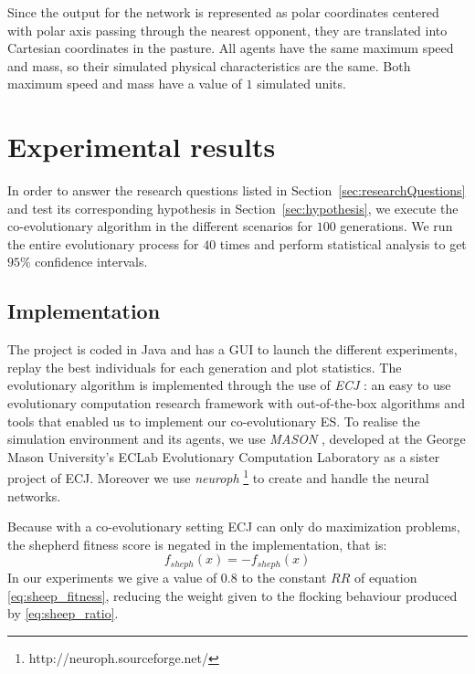 \documentclass[conference]{IEEEtran}
\begin{document}
Since the output for the network is represented as polar coordinates centered with polar axis passing through the nearest opponent, they are translated into Cartesian coordinates in the pasture. 
All agents have the same maximum speed and mass, so their simulated physical characteristics are the same.
Both maximum speed and mass have a value of $1$ simulated units.



\section{Experimental results}
\label{sec:experiment}
In order to answer the research questions listed in {Section~\ref{sec:researchQuestions}} and test its corresponding hypothesis in {Section~\ref{sec:hypothesis}}, we execute the co-evolutionary algorithm in the different scenarios for $100$ generations. 
We run the entire evolutionary process for $40$ times and perform statistical analysis to get $95\%$ confidence intervals.

\subsection{Implementation}
The project is coded in Java and has a GUI to launch the different experiments, replay the best individuals for each generation and plot statistics.
The evolutionary algorithm is implemented through the use of \textit{ECJ} \cite{luke2006ecj}: an easy to use evolutionary computation research framework with out-of-the-box algorithms and tools that enabled us to implement our co-evolutionary ES.
To realise the simulation environment and its agents, we use \textit{MASON} \cite{luke2005mason}, developed at the George Mason University's ECLab Evolutionary Computation Laboratory as a sister project of ECJ.
Moreover we use \textit{neuroph} \footnote{http://neuroph.sourceforge.net/} to create and handle the neural networks.

Because with a co-evolutionary setting ECJ can only do maximization problems, the shepherd fitness score is negated in the implementation, that is:
$$ f_{sheph}(x) = -f_{sheph}(x) $$
In our experiments we give a value of $0.8$ to the constant $RR$ of equation \eqref{eq:sheep_fitness}, reducing the weight given to the flocking behaviour produced by \eqref{eq:sheep_ratio}.
\end{document}
